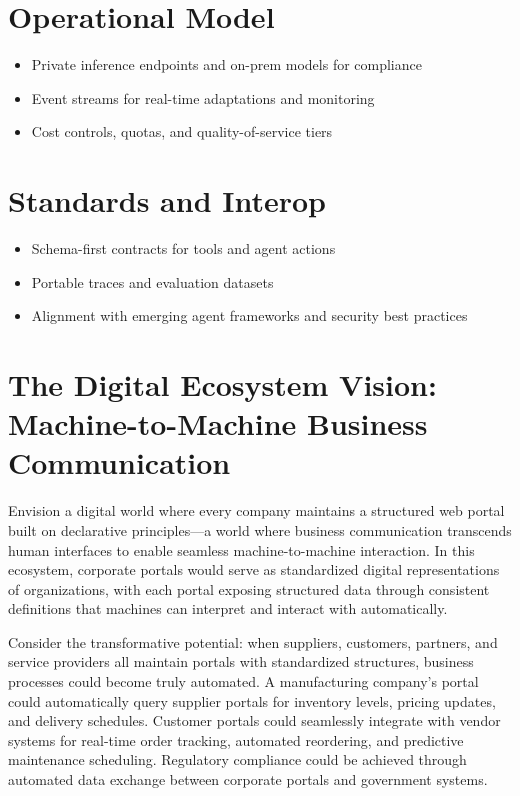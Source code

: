 \section{Operational Model}
\begin{itemize}
	\item Private inference endpoints and on-prem models for compliance
	\item Event streams for real-time adaptations and monitoring
	\item Cost controls, quotas, and quality-of-service tiers
\end{itemize}

\section{Standards and Interop}
\begin{itemize}
	\item Schema-first contracts for tools and agent actions
	\item Portable traces and evaluation datasets
	\item Alignment with emerging agent frameworks and security best practices
\end{itemize}

\section{The Digital Ecosystem Vision: Machine-to-Machine Business Communication}
\label{sec:digital-ecosystem-vision}

Envision a digital world where every company maintains a structured web portal built on declarative principles—a world where business communication transcends human interfaces to enable seamless machine-to-machine interaction. In this ecosystem, corporate portals would serve as standardized digital representations of organizations, with each portal exposing structured data through consistent \wbdl{} definitions that machines can interpret and interact with automatically.

Consider the transformative potential: when suppliers, customers, partners, and service providers all maintain portals with standardized structures, business processes could become truly automated. A manufacturing company's portal could automatically query supplier portals for inventory levels, pricing updates, and delivery schedules. Customer portals could seamlessly integrate with vendor systems for real-time order tracking, automated reordering, and predictive maintenance scheduling. Regulatory compliance could be achieved through automated data exchange between corporate portals and government systems.

